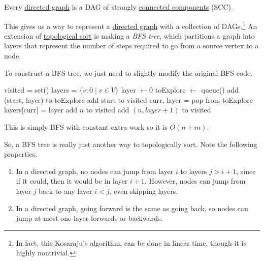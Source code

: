   \begin{theorem}
    \label{thm:condensation-of-a-directed-graph}
    Every \hyperref[def:directed-graph]{directed graph} is a DAG of strongly \hyperref[pst-def:connected-components]{connected components} (SCC). 
  \end{theorem}

  This gives us a way to represent a \hyperref[def:directed-graph]{directed graph} with a collection of DAGs.\footnote{In fact, this Kosaraju's algorithm, can be done in linear time, though it is highly nontrivial.} An extension of \hyperref[def:topological-sort]{topological sort} is making a \textit{BFS tree}, which partitions a graph into layers that represent the number of steps required to go from a source vertex to a node. 

  \begin{algo}
    To construct a BFS tree, we just need to slightly modify the original BFS code.
    \begin{algorithm}[H]
      \label{alg:bfs_tree}
      \begin{algorithmic}[1]
        \State visited = set() 
        \State layers = $\{v : 0 \mid v \in V \}$
          \State layer $\gets 0$ 
          \State toExplore $\gets$ queue() 
          \State add (start, layer) to toExplore 
          \State add start to visited
            \State curr, layer = pop from toExplore 
            \State layers[curr] = layer 
                \State add $n$ to visited 
                \State add $(n, layer+1)$ to visited 
              \EndIf
            \EndFor
          \EndWhile 
        \EndFunction
      \end{algorithmic}
    \end{algorithm}
    This is simply BFS with constant extra work so it is $O(n + m)$. 
  \end{algo}

  So, a BFS tree is really just another way to topologically sort. Note the following properties. 
  \begin{enumerate}
    \item In a directed graph, no nodes can jump from layer $i$ to layers $j > i+1$, since if it could, then it would be in layer $i+1$. However, nodes can jump from layer $j$ back to any layer $i < j$, even skipping layers. 
    \item In a directed graph, going forward is the same as going back, so nodes can jump at most one layer forwards or backwards. 
  \end{enumerate}

